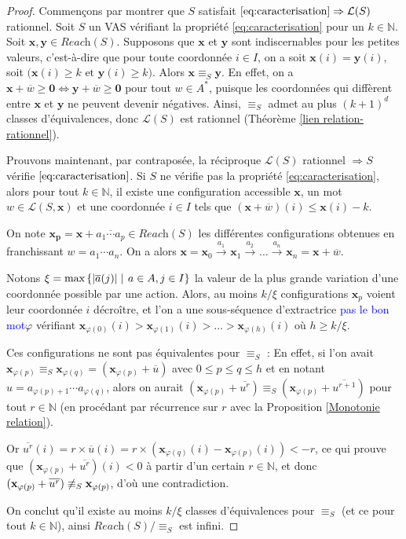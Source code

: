 \documentclass[a4paper,final]{article}
\theoremstyle{definition}
\let\phi\varphi
\let\leq\leqslant
\let\geq\geqslant
\newcommand{\alain}[1]{\textcolor{blue}{#1}}
\newcommand{\set}[2]{\left\{#1\mathrel{\left|\vphantom{#1}\vphantom{#2}\right.}#2\right\}}
\newcommand{\abs}[1]{\ensuremath{\displaystyle\left\lvert #1 \right\rvert}}
\newcommand{\N}{\ensuremath{\mathbb{N}}}
\newcommand{\lang}{\ensuremath{\mathcal{L}}}
\newcommand{\reach}{\ensuremath{\textit{Reach}}}
\newcommand{\trans}[2]{\ensuremath{\stackrel{#1}{\longrightarrow}_{#2}}}
\newcommand{\vect}[1]{\ensuremath{\mathbf{#1}}}
\newcommand{\rel}{\ensuremath{\equiv}}
\newcommand{\equivaut}{\ensuremath{\Leftrightarrow}}
\newcommand{\valeur}[1]{\ensuremath{\overline{#1}}}
\begin{document}
\begin{proof}
Commençons par montrer que $S$ satisfait $ \eqref{eq:caracterisation} \Rightarrow \lang(S)$ rationnel.
Soit $S$ un VAS vérifiant la propriété \eqref{eq:caracterisation} pour un $k\in\N$.
%
Soit $\vect{x},\vect{y}\in\reach(S)$.
Supposons que $\vect{x}$ et $\vect{y}$ sont indiscernables pour les petites valeurs, c'est-à-dire que pour toute coordonnée $i\in I$, on a 
soit $\vect{x}(i)=\vect{y}(i)$, 
soit $\big( \vect{x}(i)\geq k \text{ et } \vect{y}(i)\geq k \big)$.
Alors $\vect{x}\rel_S \vect{y}$. 
En effet, on a $\vect{x} +\valeur{w} \geq\vect{0} \equivaut \vect{y} +\valeur{w} \geq\vect{0}$ pour tout $w\in A^\ast$, 
puisque les coordonnées qui diffèrent entre $\vect{x}$ et $\vect{y}$ ne peuvent devenir négatives.
Ainsi, $\rel_S$ admet au plus $(k+1)^d$ classes d'équivalences, donc $\lang(S)$ est rationnel (Théorème \ref{lien relation-rationnel}).

Prouvons maintenant, par contraposée, la réciproque $\lang(S)$ rationnel $\Rightarrow S$ vérifie $ \eqref{eq:caracterisation}$.
Si $S$ ne vérifie pas la propriété \eqref{eq:caracterisation}, alors
pour tout $k\in\N$, il existe une configuration accessible $\vect{x}$, un mot $w\in \lang(S,\vect{x})$ et une coordonnée $i\in I$ tels que $(\vect{x} +\valeur{w})(i)\leq \vect{x}(i)-k$.

On note $\vect{x_p} = \vect{x} +\valeur{a_1\cdots a_p} \in\reach(S)$ les différentes configurations obtenues en  franchissant $w=a_1\cdots a_n$.
On a alors $\vect{x}=\vect{x}_0 \trans{a_1}{}\vect{x}_1 \trans{a_2}{}\dots \trans{a_n}{}\vect{x}_n= \vect{x} +\valeur{w}$.

Notons $\xi = \text{max}\set{\abs{\valeur{a}(j)}} {a\in A, j\in I}$ la valeur de la plus grande variation d'une coordonnée possible par une action.
Alors, au moins $k/\xi$ configurations $\vect{x}_p$ voient leur coordonnée $i$ décroître,
et l'on a une sous-séquence d'extractrice \alain{pas le bon mot}$\phi$ vérifiant $\vect{x}_{\phi(0)}(i)>\vect{x}_{\phi(1)}(i)>\dots>\vect{x}_{\phi(h)}(i)$ où $h\geq k/\xi$.


Ces configurations ne sont pas équivalentes pour $\rel_S$ :
En effet, si l'on avait $\vect{x}_{\phi(p)}\rel_S \vect{x}_{\phi(q)} = (\vect{x}_{\phi(p)} +\valeur{u})$ avec $0\leq p\leq q\leq h$ et en notant $u=a_{\phi(p)+1}\cdots a_{\phi(q)}$, 
alors on aurait $(\vect{x}_{\phi(p)} +\valeur{u^r}) \rel_S (\vect{x}_{\phi(p)} +\valeur{u^{r+1}})$ pour tout $r\in\N$ (en procédant par récurrence sur $r$ avec la Proposition \ref{Monotonie relation}).

Or $\valeur{u^r}(i) = r\times\valeur{u}(i) = r\times (\vect{x}_{\phi(q)}(i) -\vect{x}_{\phi(p)}(i)) < -r$, 
ce qui prouve que $(\vect{x}_{\phi(p)} +\valeur{u^r})(i)<0$ à partir d'un certain $r\in\N$, 
et donc $(\vect{x}_{\phi(p)} +\valeur{u^r}) \not\rel_S \vect{x}_{\phi(p)}$, d'où une contradiction.

On conclut qu'il existe au moins $k/\xi$ classes d'équivalences pour $\rel_S$ (et ce pour tout $k\in\N$), 
ainsi $\reach(S)/\rel_S$ est infini.
\end{proof}
\end{document}
